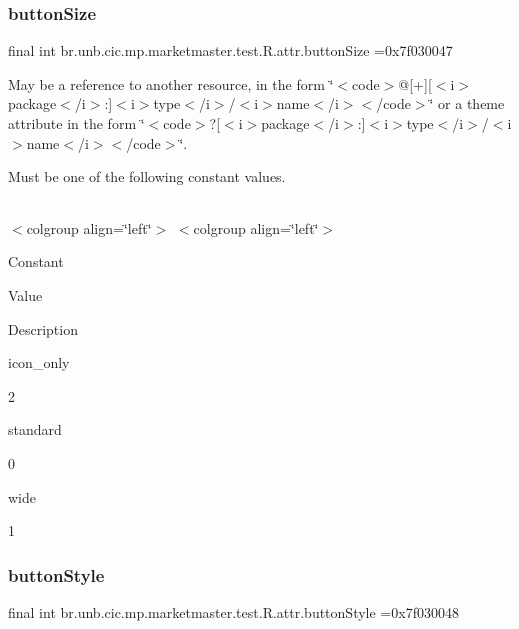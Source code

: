 \subsubsection{\texorpdfstring{button\+Size}{buttonSize}}
{\footnotesize\ttfamily final int br.\+unb.\+cic.\+mp.\+marketmaster.\+test.\+R.\+attr.\+button\+Size =0x7f030047\hspace{0.3cm}{\ttfamily [static]}}

May be a reference to another resource, in the form \char`\"{}$<$code$>$@\mbox{[}+\mbox{]}\mbox{[}$<$i$>$package$<$/i$>$\+:\mbox{]}$<$i$>$type$<$/i$>$/$<$i$>$name$<$/i$>$$<$/code$>$\char`\"{} or a theme attribute in the form \char`\"{}$<$code$>$?\mbox{[}$<$i$>$package$<$/i$>$\+:\mbox{]}$<$i$>$type$<$/i$>$/$<$i$>$name$<$/i$>$$<$/code$>$\char`\"{}. 

Must be one of the following constant values.

\tabulinesep=1mm
\begin{longtabu} spread 0pt [c]{*{0}{|X[-1]}|}
\hline
\end{longtabu}
$<$colgroup align=\char`\"{}left\char`\"{}$>$ $<$colgroup align=\char`\"{}left\char`\"{}$>$ 

Constant

Value

Description 

icon\+\_\+only

2

standard

0

wide

1\mbox{\label{classbr_1_1unb_1_1cic_1_1mp_1_1marketmaster_1_1test_1_1R_1_1attr_a16e00fd2de38e35dec69b5900bf57eeb}} 
\subsubsection{\texorpdfstring{button\+Style}{buttonStyle}}
{\footnotesize\ttfamily final int br.\+unb.\+cic.\+mp.\+marketmaster.\+test.\+R.\+attr.\+button\+Style =0x7f030048\hspace{0.3cm}{\ttfamily [static]}}

